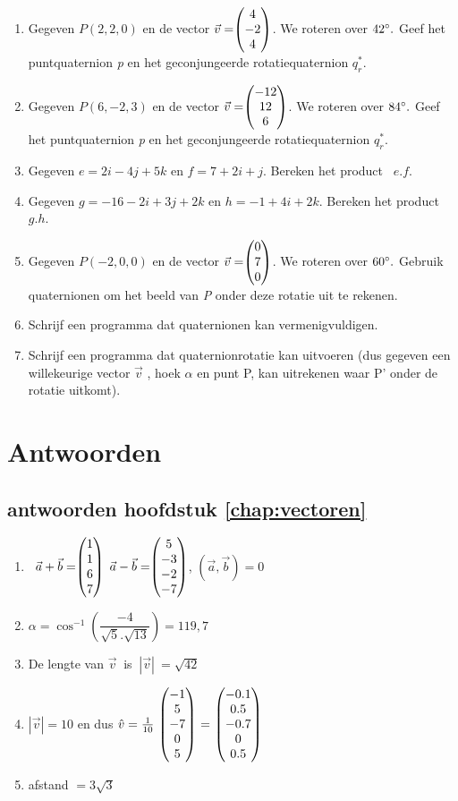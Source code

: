 \begin{enumerate}
	\item Gegeven $ P (2,2,0) $ en de vector $\vec{v} = \vecdrie{4}{-2}{4} $. 
	We roteren over $ 42\degree. $ Geef het puntquaternion \textit{p} en het geconjungeerde rotatiequaternion  $  q_r^* $. 
	
	\item Gegeven $ P (6,-2,3) $ en de vector $\vec{v} = \vecdrie{-12}{12}{6} $. 
	We roteren over $ 84\degree. $ Geef het puntquaternion \textit{p} en het geconjungeerde rotatiequaternion  $  q_r^* $. 
	
	\item Gegeven $ e = 2i-4j+5k$ en   $ f = 7+2i+j $. 
	Bereken het product \ $  e.f $.
	
	\item Gegeven $ g = -16 -2i+3j+2k $ en   $ h = -1+4i+2k $. 
	Bereken het product \ $  g.h $.
	
	\item  Gegeven $ P (-2, 0, 0) $ en de vector $\vec{v} = \vecdrie{0}{7}{0} $. 
	We roteren over $ 60\degree. $ Gebruik quaternionen om het beeld van \textit{P }onder deze rotatie uit te rekenen.   
	
	\item Schrijf een programma dat quaternionen kan vermenigvuldigen.   
	
	\item Schrijf een programma dat quaternionrotatie kan uitvoeren (dus gegeven een willekeurige vector $\vec{v} $ , hoek $ \alpha $ en punt P, kan uitrekenen waar P' onder de rotatie uitkomt).      
	
\end{enumerate}

\chapter{Antwoorden}

\section{antwoorden  hoofdstuk \ref{chap:vectoren}}
\begin{enumerate}
	\item   \ $ \vec{a} + \vec{b}  = \vecvier{1}{1}{6}{7} $   \qquad $ \vec{a} - \vec{b} = \vecvier{5}{-3}{-2}{-7} $,   \qquad $  (\vec{a} , \vec{b}) = 0 $ 
	
	
	\item  $\alpha = \cos ^{-1} (\dfrac{-4}{\sqrt{5}.\sqrt{13}}) = 119,7 $ 
	
	
	
	\item De lengte van  $  \vec{v} \ $ is $ \ |\vec{v}| \  =  \sqrt{42}$
	
	
	\item $|\vec{v}| = 10$ en dus $ \hat{v} = \frac{1}{10}\  \vecvijf{-1}{5}{-7}{0}{5} \  = \  \vecvijf{-0.1}{0.5}{-0.7}{0}{0.5} $
	
	\item afstand  $ = 3\sqrt{3} $
	
	
\end{enumerate}

